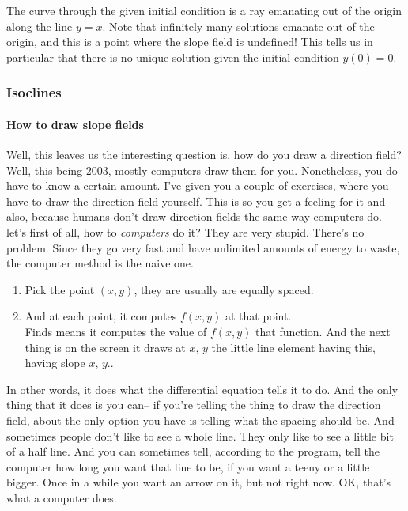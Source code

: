 The curve through the given initial condition is a ray emanating out of
the origin along the line $y = x$.
Note that infinitely many solutions emanate out of the origin,
and this is a point where the slope field is undefined!
This tells us in particular that there is no unique solution given the initial condition $y(0) = 0$.

\clearpage

\subsubsection{Isoclines}

\paragraph{How to draw slope fields}
Well, this leaves us the interesting question is, how
do you draw a direction field?
Well, this being 2003, mostly computers draw them for you.
Nonetheless, you do have to know a certain amount.
I've given you a couple of exercises,
where you have to draw the direction field yourself.
This is so you get a feeling for it
and also, because humans don't draw direction fields
the same way computers do.\\

let's first of all, how to \textit{computers} do it?
They are very stupid. There's no problem.
Since they go very fast and have unlimited amounts of energy
to waste, the computer method is the naive one.
\begin{enumerate}
\item Pick the point $(x, y)$, they are usually are equally spaced.
\item And at each point, it computes $f(x, y)$ at that point.\\
  Finds means it computes the value of $f(x, y)$ that function.
  And the next thing is on the screen it draws at $x,\, y$ the little line element having this,
  having slope $x, \,y.$.
\end{enumerate}

In other words, it does what the differential equation tells it to do.
And the only thing that it does is you can--
if you're telling the thing to draw the direction field,
about the only option you have is telling
what the spacing should be.
And sometimes people don't like to see a whole line.
They only like to see a little bit of a half line.
And you can sometimes tell, according to the program,
tell the computer how long you want that line to be,
if you want a teeny or a little bigger.
Once in a while you want an arrow on it, but not right now.
OK, that's what a computer does.\\


